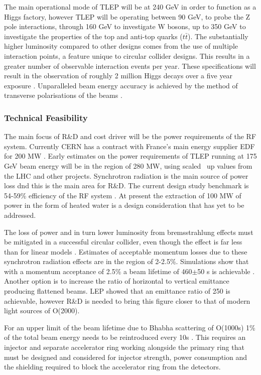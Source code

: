 The main operational mode of TLEP will be at 240 GeV in order to function as a Higgs factory, however TLEP will be operating between 90 GeV, to probe the Z pole interactions, through 160 GeV to investigate W bosons, up to 350 GeV to investigate the properties of the top and anti-top quarks ($t\bar{t}$). The substantially higher luminosity compared to other designs comes from the use of multiple interaction points, a feature unique to circular collider designs. This results in a greater number of observable interaction events per year. These specifications will result in the observation of roughly 2 million Higgs decays over a five year exposure \cite{TLEP:CERNReport}. Unparalleled beam energy accuracy is achieved by the method of transverse polarisations of the beams \cite{TLEP:Review}.

\subsubsection{Technical Feasibility}

The main focus of R\&D and cost driver will be the power requirements of the RF system. Currently CERN has a contract with France's main energy supplier EDF for 200 MW \cite{TLEP:Luminosity}. Early estimates on the power requirements of TLEP running at 175 GeV beam energy will be in the region of 280 MW, using scaled \textemdash \, up values from the LHC and other projects. Synchrotron radiation is the main source of power loss dnd this is the main area for R\&D. The current design study benchmark is 54-59\% efficiency of the RF system \cite{TLEP:Review}. At present the extraction of 100 MW of power in the form of heated water is a design consideration that has yet to be addressed.

The loss of power and in turn lower luminosity from bremsstrahlung effects must be mitigated in a successful circular collider, even though the effect is far less than for linear models \cite{TLEP:Luminosity}. Estimates of acceptable momentum losses due to these synchrotron radiation effects are in the region of 2-2.5\%. Simulations show that with a momentum acceptance of 2.5\% a beam lifetime of 460$\pm$50 s is achievable \cite{TLEP:EnergyRestriction}. Another option is to increase the ratio of horizontal to vertical emittance  \textemdash \, producing flattened beams. LEP showed that an emittance ratio of 250 is achievable, however R\&D is needed to bring this figure closer to that of modern light sources of O(2000).

For an upper limit of the beam lifetime due to Bhabha scattering of O(1000s) 1\% of the total beam energy needs to be reintroduced every 10s \cite{TLEP:Janot} \cite{TLEP:CERNOverview}. This requires an injector and separate accelerator ring working alongside the primary ring that must be designed and considered for injector strength, power consumption and the shielding required to block the accelerator ring from the detectors. 

